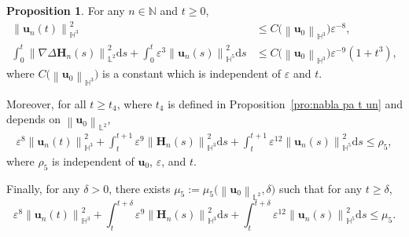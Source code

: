 \documentclass[11pt, reqno]{amsart}
\theoremstyle{definition}
\newtheorem{proposition}[theorem]{Proposition}
\numberwithin{equation}{section}
\newcommand{\bff}{\boldsymbol}
\newcommand{\bb}{\mathbb}
\newcommand{\ds}{\mathrm{d}s}
\newcommand{\bl}[1]{{\color{blue}{#1}}}
\newcommand{\norm}[2]{\left\|{#1}\right\|_{#2}}
\begin{document}
\begin{proposition}\label{pro:H3 un}
	For any $n\in \bb{N}$ and $t\geq 0$,
	\begin{align}
    \label{equ:H3 un C}
		\norm{\bff{u}_n(t)}{\bb{H}^3}^2
		&\leq
        C \big(\norm{\bff{u}_0}{\bb{H}^3}\big) \varepsilon^{-8},
        \\
    \label{equ:H5 int un}
		\int_0^t \norm{\nabla \Delta \bff{H}_n(s)}{\bb{L}^2}^2 \ds
		+
		\int_0^t \varepsilon^3 \norm{\bff{u}_n(s)}{\bb{H}^5}^2 \ds
		&\leq 
		C \big(\norm{\bff{u}_0}{\bb{H}^3}\big) \varepsilon^{-9}  \left(1+t^3 \right),
	\end{align}
	where $C \big(\norm{\bff{u}_0}{\bb{H}^3}\big)$ is a constant which is independent of $\varepsilon$ and $t$.
	
	Moreover, for all $t\geq t_4$, where $t_4$ is defined in Proposition~\ref{pro:nabla pa t un} and depends on $\norm{\bff{u}_0}{\bb{L}^2}$,
	\begin{align}\label{equ:rho 4}
		\varepsilon^{8} \norm{\bff{u}_n(t)}{\bb{H}^3}^2
		+
		\int_t^{t+1} \varepsilon^{9} \norm{\bff{H}_n(s)}{\bb{H}^3}^2 \ds
		+
		\int_t^{t+1} \varepsilon^{12} \norm{\bff{u}_n(s)}{\bb{H}^5}^2 \ds 
        \leq \rho_5,
	\end{align}
	where $\rho_5$ is independent of $\bff{u}_0$, $\varepsilon$, and $t$.
	
	Finally, for any $\delta>0$, there exists $\mu_5:= \mu_5\big(\norm{\bff{u}_0}{\bb{L}^2}, \delta\big)$ such that for any $t\geq \delta$,
	\begin{equation}\label{equ:mu 4}
	\varepsilon^{8} \norm{\bff{u}_n(t)}{\bb{H}^3}^2
	+
	\int_t^{t+\delta} \varepsilon^{9} \norm{\bff{H}_n(s)}{\bb{H}^3}^2 \ds
	+
	\int_t^{t+\delta} \varepsilon^{12} \norm{\bff{u}_n(s)}{\bb{H}^5}^2 \ds
	\leq 
    \mu_5.
	\end{equation}
\end{proposition}
\end{document}
